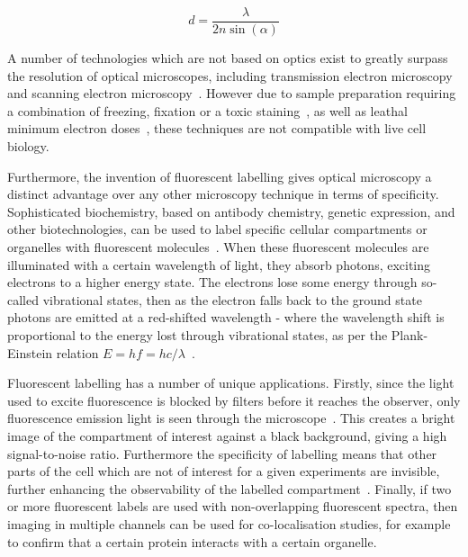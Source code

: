 \begin{equation} \label{eq:abbe}
d = \frac{\lambda}{2n\sin\left (\alpha  \right )}\end{equation}

A number of technologies which are not based on optics exist to greatly surpass the resolution of optical microscopes, including transmission electron microscopy and scanning electron microscopy~\cite{reinhold1931configuration, wells2006early, reimer2013transmission}.
However due to sample preparation requiring a combination of freezing, fixation or a toxic staining~\cite{kuo2007electron}, as well as leathal minimum electron doses~\cite{de2016live}, these techniques are not compatible with live cell biology.

Furthermore, the invention of fluorescent labelling gives optical microscopy a distinct advantage over any other microscopy technique in terms of specificity. 
Sophisticated biochemistry, based on antibody chemistry, genetic expression, and other biotechnologies, can be used to label specific cellular compartments or organelles with fluorescent molecules~\cite{day2014fluorescent}. 
When these fluorescent molecules are illuminated with a certain wavelength of light, they absorb photons, exciting electrons to a higher energy state. 
The electrons lose some energy through so-called vibrational states, then as the electron falls back to the ground state photons are emitted at a red-shifted wavelength - where the wavelength shift is proportional to the energy lost through vibrational states, as per the Plank-Einstein relation $E=hf=hc/\lambda$~\cite[\textit{ch. 39}]{halliday2010principles}. 

Fluorescent labelling has a number of unique applications. 
Firstly, since the light used to excite fluorescence is blocked by filters before it reaches the observer, only fluorescence emission light is seen through the microscope~\cite{ploem1967use}. 
This creates a bright image of the compartment of interest against a black background, giving a high signal-to-noise ratio.
Furthermore the specificity of labelling means that other parts of the cell which are not of interest for a given experiments are invisible, further enhancing the observability of the labelled compartment~\cite{day2014fluorescent}.
Finally, if two or more fluorescent labels are used with non-overlapping fluorescent spectra, then imaging in multiple channels can be used for co-localisation studies, for example to confirm that a certain protein interacts with a certain organelle. 

